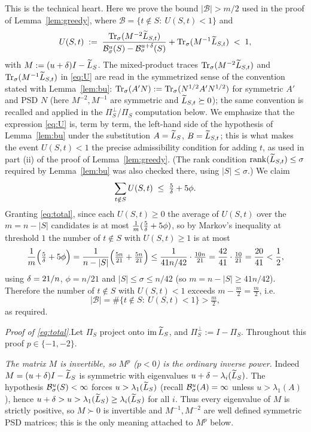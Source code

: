This is the technical heart. Here we prove the bound $|\mathcal{B}|>m/2$ used
in the proof of Lemma~\ref{lem:greedy}, where
$\mathcal{B}=\{t\notin S:\ U(S,t)<1\}$ and
\begin{equation}\label{eq:U}
  U(S,t) \;:=\;
  \frac{\operatorname{Tr}_{\sigma}(M^{-2}\widetilde{L}_{S,t})}{\mathcal{B}^{u}_{\sigma}(S)-\mathcal{B}^{u+\delta}_{\sigma}(S)}
   + \operatorname{Tr}_{\sigma}(M^{-1}\widetilde{L}_{S,t}) \;<\; 1,
\end{equation}
with $M:=(u+\delta)I-\widetilde{L}_S$. The mixed-product traces
$\operatorname{Tr}_{\sigma}(M^{-2}\widetilde{L}_{S,t})$ and $\operatorname{Tr}_{\sigma}(M^{-1}\widetilde{L}_{S,t})$ in \eqref{eq:U}
are read in the symmetrized sense of the convention stated with
Lemma~\ref{lem:bu}: $\operatorname{Tr}_{\sigma}(A'N):=\operatorname{Tr}_{\sigma}(N^{1/2}A'N^{1/2})$ for symmetric
$A'$ and PSD $N$ (here $M^{-2},M^{-1}$ are symmetric and $\widetilde{L}_{S,t}\succeq0$);
the same convention is recalled and applied in the $\Pi_S^\perp$/$\Pi_S$
computation below. We emphasize that the expression \eqref{eq:U}
is, term by term, the left-hand side of the hypothesis of Lemma~\ref{lem:bu}
under the substitution $A=\widetilde{L}_S$, $B=\widetilde{L}_{S,t}$; this is what makes the
event $U(S,t)<1$ the precise admissibility condition for adding $t$, as used in
part (ii) of the proof of Lemma~\ref{lem:greedy}. (The rank condition
$\operatorname{rank}(\widetilde{L}_{S,t})\le\sigma$ required by Lemma~\ref{lem:bu} was also
checked there, using $|S|\le\sigma$.) We claim
\begin{equation}\label{eq:total}
  \sum_{t\notin S} U(S,t) \;\le\; \tfrac{5}{\delta} + 5\phi.
\end{equation}
Granting \eqref{eq:total}, since each $U(S,t)\ge 0$ the average of $U(S,t)$ over
the $m=n-|S|$ candidates is at most $\tfrac1m(\tfrac5{\delta}+5\phi)$, so by
Markov's inequality at threshold $1$ the number of $t\notin S$ with
$U(S,t)\ge1$ is at most
\[
  \frac{1}{m}\Bigl(\tfrac{5}{\delta}+5\phi\Bigr)
  =\frac{1}{n-|S|}\Bigl(\tfrac{5n}{21}+\tfrac{5n}{21}\Bigr)
  \le\frac{1}{41n/42}\cdot\tfrac{10n}{21}
  =\frac{42}{41}\cdot\tfrac{10}{21}
  =\frac{20}{41}<\frac12 ,
\]
using $\delta=21/n$, $\phi=n/21$ and $|S|\le\sigma\le n/42$ (so
$m=n-|S|\ge 41n/42$). Therefore the number of $t\notin S$ with $U(S,t)<1$
exceeds $m-\tfrac{m}{2}=\tfrac{m}{2}$, i.e.
\[
  |\mathcal{B}|=\#\{t\notin S:\ U(S,t)<1\}>\tfrac{m}{2},
\]
as required.

\medskip
\noindent\emph{Proof of \eqref{eq:total}.}\quad Let $\Pi_S$ project onto
$\operatorname{im}\widetilde{L}_S$, and $\Pi_S^\perp:=I-\Pi_S$. Throughout this proof $p\in\{-1,-2\}$.

\emph{The matrix $M$ is invertible, so $M^p$ ($p<0$) is the ordinary inverse
power.} Indeed $M=(u+\delta)I-\widetilde{L}_S$ is symmetric with eigenvalues
$u+\delta-\lambda_i(\widetilde{L}_S)$. The hypothesis $\mathcal{B}^{u}_{\sigma}(S)<\infty$
forces $u>\lambda_1(\widetilde{L}_S)$ (recall $\mathcal{B}^{u}_{\sigma}(A)=\infty$ unless
$u>\lambda_1(A)$), hence $u+\delta>u>\lambda_1(\widetilde{L}_S)\ge\lambda_i(\widetilde{L}_S)$
for all $i$. Thus every eigenvalue of $M$ is strictly positive, so $M\succ0$ is
invertible and $M^{-1},M^{-2}$ are well defined symmetric PSD matrices; this is the
only meaning attached to $M^p$ below.

